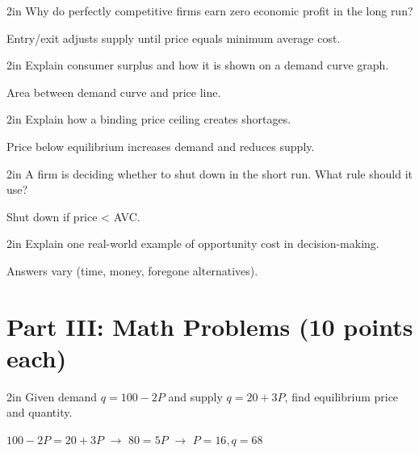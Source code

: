 \documentclass[12pt]{exam}
\begin{document}
\begin{questions}
    \begin{shortanswer}[10]{2in}
        Why do perfectly competitive firms earn zero economic profit in the long run?
    \end{shortanswer}
    \begin{solution}
        Entry/exit adjusts supply until price equals minimum average cost.
    \end{solution}

    \begin{shortanswer}[10]{2in}
        Explain consumer surplus and how it is shown on a demand curve graph.
    \end{shortanswer}
    \begin{solution}
        Area between demand curve and price line.
    \end{solution}

    \begin{shortanswer}[10]{2in}
        Explain how a binding price ceiling creates shortages.
    \end{shortanswer}
    \begin{solution}
        Price below equilibrium increases demand and reduces supply.
    \end{solution}

    \begin{shortanswer}[10]{2in}
        A firm is deciding whether to shut down in the short run. What rule should it use?
    \end{shortanswer}
    \begin{solution}
        Shut down if price < AVC.
    \end{solution}

    \begin{shortanswer}[10]{2in}
        Explain one real-world example of opportunity cost in decision-making.
    \end{shortanswer}
    \begin{solution}
        Answers vary (time, money, foregone alternatives).
    \end{solution}

    \section*{Part III: Math Problems (10 points each)}

    \begin{problem}[10]{2in}
    Given demand $q = 100 - 2P$ and supply $q = 20 + 3P$, find equilibrium price and quantity.
    \end{problem}
    \begin{solution}
        $100 - 2P = 20 + 3P$ $\rightarrow$ $80 = 5P$ $\rightarrow$ $P = 16, q = 68$
    \end{solution}


\end{questions}
\end{document}
